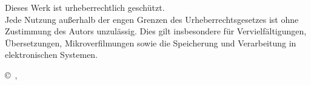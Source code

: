 \vspace*{\fill}
\singlespacing
{\small \noindent Dieses Werk ist urheberrechtlich geschützt.\\ 
Jede Nutzung außerhalb der engen Grenzen des Urheberrechtsgesetzes ist ohne Zustimmung des Autors unzulässig. Dies gilt insbesondere für Vervielfältigungen, Übersetzungen, Mikroverfilmungen sowie die Speicherung und Verarbeitung in elektronischen Systemen.\\[0.5em]}

\noindent \copyright~\authorname, \jahr \\
\frenchspacing
{}

